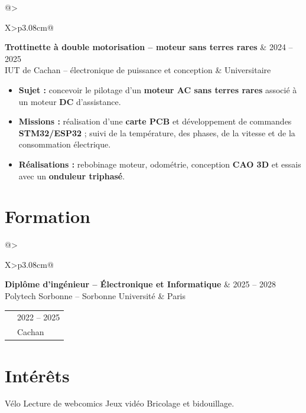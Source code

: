 \documentclass[9pt,a4paper]{extarticle}
\makeatletter
\newcommand{\entry}[4]{%
\begin{tabularx}{\linewidth}{@{}>{\raggedright\arraybackslash}X>{\raggedleft\arraybackslash}p{3.08cm}@{}}
 {\bfseries\color{bleu}#1} & {\fontsize{8.5}{9.3}\selectfont\color{secondaire}#2} \\[-2pt]
 {\fontsize{8.5}{9.6}\selectfont\color{secondaire}#3} & {\fontsize{8.5}{9.3}\selectfont\color{secondaire}#4}
\end{tabularx}\vspace{-2.6pt}\par}
\newcommand{\gapentry}{\vspace{2.4pt}}
\makeatother
\begin{document}
\gapentry
\entry{Trottinette à double motorisation -- moteur sans terres rares}{2024 -- 2025}{IUT de Cachan -- électronique de puissance et conception}{Universitaire}
\begin{itemize}
  \item \textbf{Sujet :} concevoir le pilotage d'un \textbf{moteur AC sans terres rares} associé à un moteur \textbf{DC} d'assistance.
  \item \textbf{Missions :} réalisation d'une \textbf{carte PCB} et développement de commandes \textbf{STM32/ESP32} ; suivi de la température, des phases, de la vitesse et de la consommation électrique.
  \item \textbf{Réalisations :} rebobinage moteur, odométrie, conception \textbf{CAO 3D} et essais avec un \textbf{onduleur triphasé}.
\end{itemize}

\section{Formation}
\entry{Diplôme d'ingénieur -- Électronique et Informatique}{2025 -- 2028}{Polytech Sorbonne -- Sorbonne Université}{Paris}
\vspace{1pt}
\entry{BUT Génie électrique et informatique industrielle -- option Électricité et maîtrise de l'énergie}{2022 -- 2025}{IUT de Cachan -- Université Paris-Saclay}{Cachan}

\section{Intérêts}
{\fontsize{8.7}{10.1}\selectfont
Vélo \textcolor{rouge}{\textbullet} Lecture de webcomics \textcolor{rouge}{\textbullet} Jeux vidéo \textcolor{rouge}{\textbullet} Bricolage et bidouillage.
}
\end{document}
